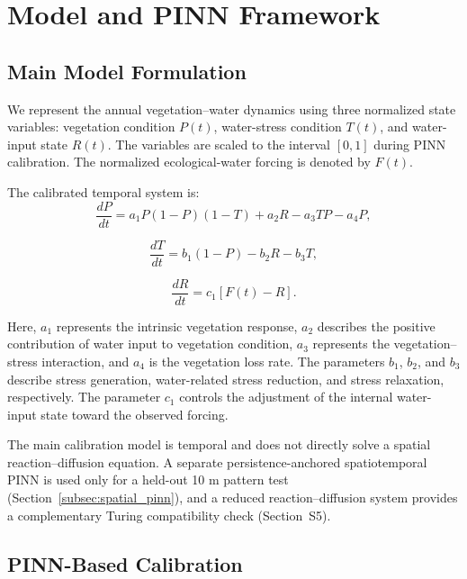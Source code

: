 \documentclass[preprint,review,12pt,3p]{elsarticle}
\begin{document}
	\section{Model and PINN Framework}
	
\subsection{Main Model Formulation}

We represent the annual vegetation--water dynamics using three normalized state variables: vegetation condition $P(t)$, water-stress condition $T(t)$, and water-input state $R(t)$. The variables are scaled to the interval $[0,1]$ during PINN calibration. The normalized ecological-water forcing is denoted by $F(t)$.

The calibrated temporal system is:
\begin{equation}
	\frac{dP}{dt}
	=
	a_1P(1-P)(1-T)+a_2R-a_3TP-a_4P,
	\label{eq:P}
\end{equation}

\begin{equation}
	\frac{dT}{dt}
	=
	b_1(1-P)-b_2R-b_3T,
	\label{eq:T}
\end{equation}

\begin{equation}
	\frac{dR}{dt}
	=
	c_1\left[F(t)-R\right].
	\label{eq:R}
\end{equation}

Here, $a_1$ represents the intrinsic vegetation response, $a_2$ describes the positive contribution of water input to vegetation condition, $a_3$ represents the vegetation--stress interaction, and $a_4$ is the vegetation loss rate. The parameters $b_1$, $b_2$, and $b_3$ describe stress generation, water-related stress reduction, and stress relaxation, respectively. The parameter $c_1$ controls the adjustment of the internal water-input state toward the observed forcing.

The main calibration model is temporal and does not directly solve a spatial reaction--diffusion equation. A separate persistence-anchored spatiotemporal PINN is used only for a held-out 10 m pattern test (Section~\ref{subsec:spatial_pinn}), and a reduced reaction--diffusion system provides a complementary Turing compatibility check (Section~S5).
	
	\subsection{PINN-Based Calibration}
	
\end{document}
